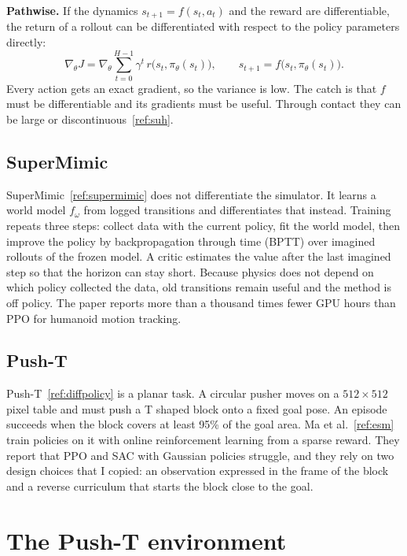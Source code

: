\documentclass[11pt,a4paper]{article}
\renewcommand{\cite}[1]{\ref{ref:#1}}
\begin{document}
\textbf{Pathwise.} If the dynamics $s_{t+1}=f(s_t,a_t)$ and the reward are differentiable, the
return of a rollout can be differentiated with respect to the policy parameters directly:
\begin{equation}
  \nabla_\theta J = \nabla_\theta \sum_{t=0}^{H-1} \gamma^t\, r\big(s_t, \pi_\theta(s_t)\big),
  \qquad s_{t+1} = f\big(s_t,\pi_\theta(s_t)\big).
\end{equation}
Every action gets an exact gradient, so the variance is low. The catch is that $f$ must be
differentiable and its gradients must be useful. Through contact they can be large or
discontinuous~\cite{suh}.

\subsection{SuperMimic}

SuperMimic~\cite{supermimic} does not differentiate the simulator. It learns a world model
$f_\omega$ from logged transitions and differentiates that instead. Training repeats three steps:
collect data with the current policy, fit the world model, then improve the policy by
backpropagation through time (BPTT) over imagined rollouts of the frozen model. A critic estimates
the value after the last imagined step so that the horizon can stay short. Because physics does not
depend on which policy collected the data, old transitions remain useful and the method is off
policy. The paper reports more than a thousand times fewer GPU hours than PPO for humanoid
motion tracking.

\subsection{Push-T}

Push-T~\cite{diffpolicy} is a planar task. A circular pusher moves on a $512 \times 512$ pixel
table and must push a T shaped block onto a fixed goal pose. An episode succeeds when the block
covers at least 95\% of the goal area. Ma et al.~\cite{esm} train policies on it with online
reinforcement learning from a sparse reward. They report that PPO and SAC with Gaussian policies
struggle, and they rely on two design choices that I copied: an observation expressed in the frame
of the block and a reverse curriculum that starts the block close to the goal.

\section{The Push-T environment}
\label{sec:env}
\end{document}
